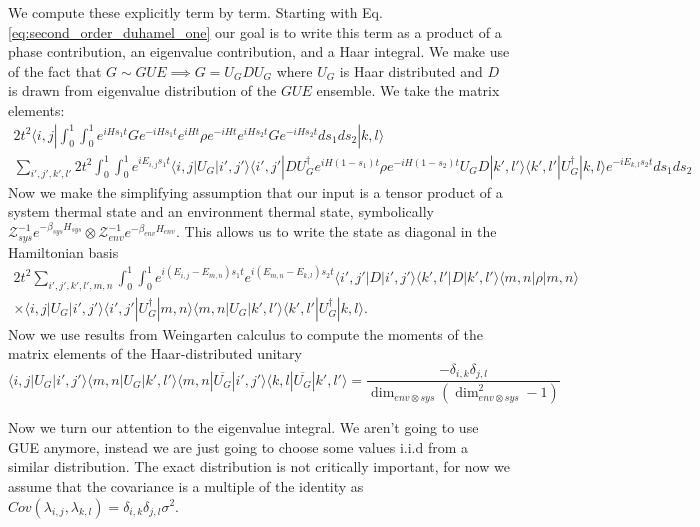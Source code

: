 \documentclass{article}
\newcommand{\ket}[1]{|#1\rangle}
\newcommand{\bra}[1]{\langle #1|}
\newcommand{\partfun}{\mathcal{Z}}
\begin{document}
We compute these explicitly term by term. Starting with Eq. \eqref{eq:second_order_duhamel_one} our goal is to write this term as a product of a phase contribution, an eigenvalue contribution, and a Haar integral. We make use of the fact that $G \sim GUE \implies G = U_G D U_G$ where $U_G$ is Haar distributed and $D$ is drawn from eigenvalue distribution of the $GUE$ ensemble. We take the matrix elements:
\begin{align}
    2 t^2 \bra{i,j} \int_{0}^1 \int_0^1 e^{i H s_1 t} G e^{-iH s_1 t} e^{i H t} \rho e^{-i H t} e^{i H s_2 t} G e^{-iH s_2 t} ds_1 ds_2 \ket{k,l} \\
    \sum_{i',j',k',l'} 2t^2 \int_0^1 \int_0^1 e^{i E_{i,j} s_1 t} \bra{i,j} U_G \ket{i',j'} \bra{i',j'} D U_G^\dagger e^{i H (1-s_1) t} \rho e^{-i H (1-s_2) t} U_G D \ket{k',l'} \bra{k',l'} U_G^\dagger \ket{k,l} e^{-i E_{k,l} s_2 t} ds_1 ds_2 
\end{align}
Now we make the simplifying assumption that our input is a tensor product of a system thermal state and an environment thermal state, symbolically $\partfun_{sys}^{-1} e^{-\beta_{sys} H_{sys}} \otimes \partfun_{env}^{-1} e^{-\beta_{env}H_{env}}$. This allows us to write the state as diagonal in the Hamiltonian basis
\begin{align}
   2 t^2 \sum_{i',j',k',l', m,n} \int_0^1 \int_0^1 e^{i (E_{i,j} - E_{m,n}) s_1 t}  e^{i (E_{m,n} - E_{k,l})s_2 t} \bra{i',j'} D \ket{i',j'} \bra{k',l'} D \ket{k', l'} \bra{m,n} \rho \ket{m,n} \\
   \times \bra{i,j} U_G \ket{i',j'} \bra{i',j'} U_G^\dagger \ket{m,n} \bra{m,n} U_G \ket{k',l'} \bra{k',l'} U_G^\dagger \ket{k,l}.
\end{align}
Now we use results from Weingarten calculus to compute the moments of the matrix elements of the Haar-distributed unitary
\begin{equation}
    \bra{i,j} U_G \ket{i',j'} \bra{m,n} U_G \ket{k',l'} \bra{m,n} \overline{U_G} \ket{i',j'} \bra{k,l} \overline{U_G} \ket{k',l'} = \frac{-\delta_{i,k} \delta_{j,l}}{\dim_{env\otimes sys} (\dim_{env \otimes sys}^2 - 1)}
\end{equation}

Now we turn our attention to the eigenvalue integral. We aren't going to use GUE anymore, instead we are just going to choose some values i.i.d from a similar distribution. The exact distribution is not critically important, for now we assume that the covariance is a multiple of the identity as $Cov(\lambda_{i,j}, \lambda_{k,l}) = \delta_{i,k} \delta_{j,l} \sigma^2$. 
\end{document}
